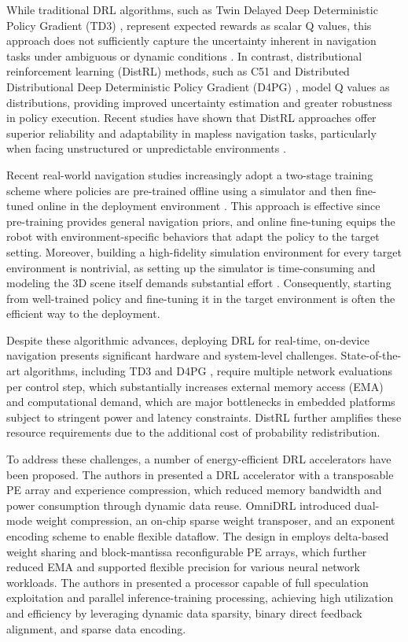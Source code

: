 While traditional DRL algorithms, such as Twin Delayed Deep Deterministic Policy Gradient (TD3) \cite{TD3}, represent expected rewards as scalar Q values, this approach does not sufficiently capture the uncertainty inherent in navigation tasks under ambiguous or dynamic conditions \cite{ur23, AAAI19}. In contrast, distributional reinforcement learning (DistRL) methods, such as C51 \cite{C51} and Distributed Distributional Deep Deterministic Policy Gradient (D4PG) \cite{d4pg}, model Q values as distributions, providing improved uncertainty estimation and greater robustness in policy execution. Recent studies have shown that DistRL approaches offer superior reliability and adaptability in mapless navigation tasks, particularly when facing unstructured or unpredictable environments \cite{ur23, nctu_fr, NCTU}.

Recent real-world navigation studies increasingly adopt a two-stage training scheme where policies are pre-trained offline using a simulator and then fine-tuned online in the deployment environment \cite{lifelong, selfi, fastrlap}. This approach is effective since pre-training provides general navigation priors, and online fine-tuning equips the robot with environment-specific behaviors that adapt the policy to the target setting. Moreover, building a high-fidelity simulation environment for every target environment is nontrivial, as setting up the simulator is time-consuming and modeling the 3D scene itself demands substantial effort \cite{iros_interview}. Consequently, starting from well-trained policy and fine-tuning it in the target environment is often the efficient way to the deployment.

Despite these algorithmic advances, deploying DRL for real-time, on-device navigation presents significant hardware and system-level challenges. State-of-the-art algorithms, including TD3 \cite{TD3} and D4PG \cite{d4pg}, require multiple network evaluations per control step, which substantially increases external memory access (EMA) and computational demand, which are major bottlenecks in embedded platforms subject to stringent power and latency constraints. DistRL further amplifies these resource requirements due to the additional cost of probability redistribution.

To address these challenges, a number of energy-efficient DRL accelerators have been proposed. The authors in \cite{ISSCC19} presented a DRL accelerator with a transposable PE array and experience compression, which reduced memory bandwidth and power consumption through dynamic data reuse. OmniDRL \cite{VLSI21} introduced dual-mode weight compression, an on-chip sparse weight transposer, and an exponent encoding scheme to enable flexible dataflow. The design in \cite{TCASII24} employs delta-based weight sharing and block-mantissa reconfigurable PE arrays, which further reduced EMA and supported flexible precision for various neural network workloads. The authors in \cite{CICC25} presented a processor capable of full speculation exploitation and parallel inference-training processing, achieving high utilization and efficiency by leveraging dynamic data sparsity, binary direct feedback alignment, and sparse data encoding.

